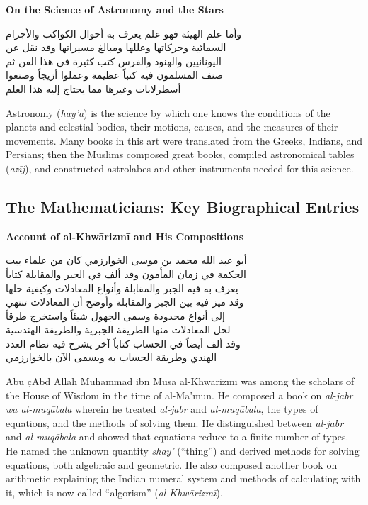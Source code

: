 \documentclass[11pt,a4paper]{article}
\newcommand{\ar}[1]{{\arabicfont\beginR #1\endR}}
\newcommand{\bilingual}[2]{%
  \noindent
  \begin{minipage}[t]{0.47\textwidth}
    \vspace{0pt}
    \begin{flushright}
    {\arabicfont\beginR #1\endR}
    \end{flushright}
  \end{minipage}%
  \hfill\vline\hfill
  \begin{minipage}[t]{0.47\textwidth}
    \vspace{0pt}
    #2
  \end{minipage}%
  \par\vspace{0.8em}
}
\newcommand{\bilingualsubsection}[2]{%
  \vspace{0.6em}%
  \noindent
  \begin{minipage}[t]{0.47\textwidth}
    \begin{flushright}
    \textbf{\color{sectioncolor}\ar{#1}}
    \end{flushright}
  \end{minipage}%
  \hfill
  \begin{minipage}[t]{0.47\textwidth}
    \textbf{\color{sectioncolor}#2}
  \end{minipage}%
  \par\vspace{0.4em}%
}
\begin{document}
\bilingualsubsection{في علم الفلك والنجوم}{On the Science of Astronomy and the Stars}

\bilingual
{وأما علم الهيئة فهو علم يعرف به أحوال الكواكب والأجرام\\
السمائية وحركاتها وعللها ومبالغ مسيراتها وقد نقل عن\\
اليونانيين والهنود والفرس كتب كثيرة في هذا الفن ثم\\
صنف المسلمون فيه كتباً عظيمة وعملوا أزيجاً وصنعوا\\
أسطرلابات وغيرها مما يحتاج إليه هذا العلم}
{Astronomy (\textit{hay'a}) is the science by which one knows the
conditions of the planets and celestial bodies, their motions, causes,
and the measures of their movements. Many books in this art were
translated from the Greeks, Indians, and Persians; then the Muslims
composed great books, compiled astronomical tables (\textit{az\=ij}), and
constructed astrolabes and other instruments needed for this science.}

\newpage

\subsection{The Mathematicians: Key Biographical Entries}
\label{subsec:mathematicians}

\bilingualsubsection{ذكر الخوارزمي ومصنفاته}{Account of al-Khw\=arizm\=i and His Compositions}

\vspace{0.5em}
\bilingual
{أبو عبد الله محمد بن موسى الخوارزمي كان من علماء بيت\\
الحكمة في زمان المأمون وقد ألف في الجبر والمقابلة كتاباً\\
يعرف به فيه الجبر والمقابلة وأنواع المعادلات وكيفية حلها\\
وقد ميز فيه بين الجبر والمقابلة وأوضح أن المعادلات تنتهي\\
إلى أنواع محدودة وسمى الجهول شيئاً واستخرج طرقاً\\
لحل المعادلات منها الطريقة الجبرية والطريقة الهندسية\\
وقد ألف أيضاً في الحساب كتاباً آخر يشرح فيه نظام العدد\\
الهندي وطريقة الحساب به ويسمى الآن بالخوارزمي}
{Ab\=u \d{c}Abd All\=ah Mu\d{h}ammad ibn M\=us\=a al-Khw\=arizm\=i
was among the scholars of the House of Wisdom in the time of al-Ma'mun.
He composed a book on \textit{al-jabr wa al-muq\=abala} wherein he treated
\textit{al-jabr} and \textit{al-muq\=abala}, the types of equations, and
the methods of solving them. He distinguished between \textit{al-jabr} and
\textit{al-muq\=abala} and showed that equations reduce to a finite number
of types. He named the unknown quantity \textit{shay'} (``thing'') and
derived methods for solving equations, both algebraic and geometric. He
also composed another book on arithmetic explaining the Indian numeral
system and methods of calculating with it, which is now called
``algorism'' (\textit{al-Khw\=arizm\=i}).}
\end{document}
